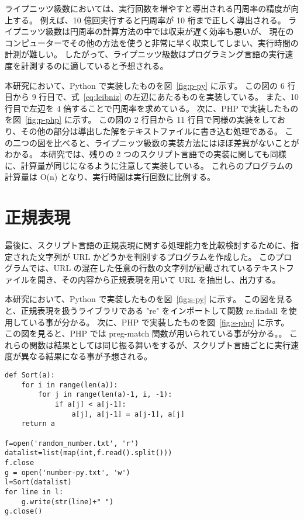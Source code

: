ライプニッツ級数においては、実行回数を増やすと導出される円周率の精度が向上する。
例えば、10 億回実行すると円周率が 10 桁まで正しく導出される。
ライプニッツ級数は円周率の計算方法の中では収束が遅く効率も悪いが、
現在のコンピューターでその他の方法を使うと非常に早く収束してしまい、実行時間の計測が難しい。
したがって、ライプニッツ級数はプログラミング言語の実行速度を計測するのに適していると予想される。

本研究において、Python で実装したものを図~\ref{fig:p-py} に示す。
この図の 6 行目から 9 行目で、式~\ref{eq:leibniz} の左辺にあたるものを実装している。
また、10 行目で左辺を 4 倍することで円周率を求めている。
次に、PHP で実装したものを図~\ref{fig:p-php} に示す。
この図の 2 行目から 11 行目で同様の実装をしており、その他の部分は導出した解をテキストファイルに書き込む処理である。
この二つの図を比べると、ライプニッツ級数の実装方法にはほぼ差異がないことがわかる。
本研究では、残りの 2 つのスクリプト言語での実装に関しても同様に、計算量が同じになるように注意して実装している。
これらのプログラムの計算量は O(n) となり、実行時間は実行回数に比例する。

\section{正規表現}
\label{cha:program:regex}

最後に、スクリプト言語の正規表現に関する処理能力を比較検討するために、指定された文字列が URL かどうかを判別するプログラムを作成した。
このプログラムでは、URL の混在した任意の行数の文字列が記載されているテキストファイルを開き、その内容から正規表現を用いて URL を抽出し、出力する。

本研究において、Python で実装したものを図~\ref{fig:s-py} に示す。
この図を見ると、正規表現を扱うライブラリである "re" をインポートして関数 re.findall を使用している事が分かる。
次に、PHP で実装したものを図~\ref{fig:s-php} に示す。
この図を見ると、PHP では preg-match 関数が用いられている事が分かる。。
これらの関数は結果としては同じ振る舞いをするが、スクリプト言語ごとに実行速度が異なる結果になる事が予想される。

\clearpage
\begin{lstlisting}[label={fig:b-rb}, caption={Python3 バブルソート}, basicstyle=\ttfamily\footnotesize, frame=single]
def Sort(a):
    for i in range(len(a)):
        for j in range(len(a)-1, i, -1):
            if a[j] < a[j-1]:
                a[j], a[j-1] = a[j-1], a[j]
    return a

f=open('random_number.txt', 'r')
datalist=list(map(int,f.read().split()))
f.close
g = open('number-py.txt', 'w')
l=Sort(datalist)
for line in l:
    g.write(str(line)+" ")
g.close()
\end{lstlisting}

